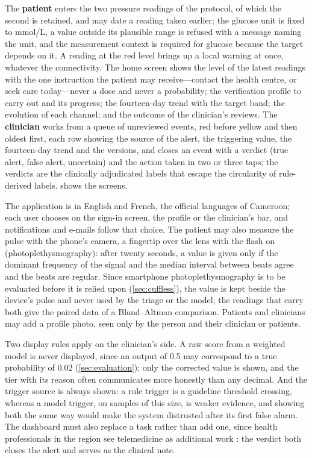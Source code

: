 \documentclass[11pt,a4paper,oneside]{report}
\begin{document}
The \textbf{patient} enters the two pressure readings of the protocol, of which the second is retained, and may date a reading taken earlier; the glucose unit is fixed to mmol/L, a value outside its plausible range is refused with a message naming the unit, and the measurement context is required for glucose because the target depends on it. A reading at the red level brings up a local warning at once, whatever the connectivity. The home screen shows the level of the latest readings with the one instruction the patient may receive---contact the health centre, or seek care today---never a dose and never a probability; the verification profile to carry out and its progress; the fourteen-day trend with the target band; the evolution of each channel; and the outcome of the clinician's reviews. The \textbf{clinician} works from a queue of unreviewed events, red before yellow and then oldest first, each row showing the source of the alert, the triggering value, the fourteen-day trend and the versions, and closes an event with a verdict (true alert, false alert, uncertain) and the action taken in two or three taps; the verdicts are the clinically adjudicated labels that escape the circularity of rule-derived labels.  shows the screens.

The application is in English and French, the official languages of Cameroon; each user chooses on the sign-in screen, the profile or the clinician's bar, and notifications and e-mails follow that choice. The patient may also measure the pulse with the phone's camera, a fingertip over the lens with the flash on (photoplethysmography): after twenty seconds, a value is given only if the dominant frequency of the signal and the median interval between beats agree and the beats are regular. Since smartphone photoplethysmography is to be evaluated before it is relied upon (\cref{sec:cuffless}), the value is kept beside the device's pulse and never used by the triage or the model; the readings that carry both give the paired data of a Bland--Altman comparison. Patients and clinicians may add a profile photo, seen only by the person and their clinician or patients.

Two display rules apply on the clinician's side. A raw score from a weighted model is never displayed, since an output of 0.5 may correspond to a true probability of 0.02 (\cref{sec:evaluation}); only the corrected value is shown, and the tier with its reason often communicates more honestly than any decimal. And the trigger source is always shown: a rule trigger is a guideline threshold crossing, whereas a model trigger, on samples of this size, is weaker evidence, and showing both the same way would make the system distrusted after its first false alarm. The dashboard must also replace a task rather than add one, since health professionals in the region see telemedicine as additional work \parencite{dodoo2022}: the verdict both closes the alert and serves as the clinical note.
\end{document}
